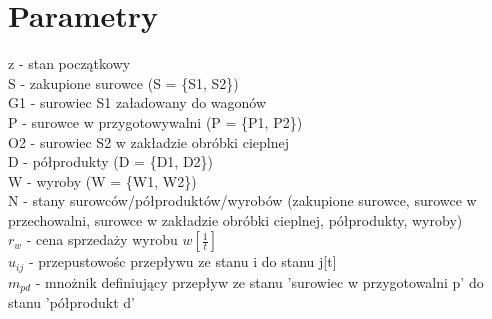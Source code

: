 \section{Parametry}
z - stan początkowy \\
S - zakupione surowce (S = \{S1, S2\}) \\
G1 - surowiec S1 załadowany do wagonów \\
P - surowce w przygotowywalni (P = \{P1, P2\}) \\
O2 - surowiec S2 w zakładzie obróbki cieplnej \\
D - półprodukty (D = \{D1, D2\}) \\ 
W - wyroby (W = \{W1, W2\}) \\
N - stany surowców/półproduktów/wyrobów (zakupione surowce, surowce w przechowalni, surowce w zakładzie obróbki cieplnej, półprodukty, wyroby) \\ 
$r_w$ - cena sprzedaży wyrobu $w[\frac{1}{t}]$ \\
$u_{ij}$ - przepustowośc przepływu ze stanu i do stanu j[t] \\ 
$m_{pd}$ - mnożnik definiujący przepływ ze stanu 'surowiec w przygotowalni p' do stanu 'półprodukt d'

